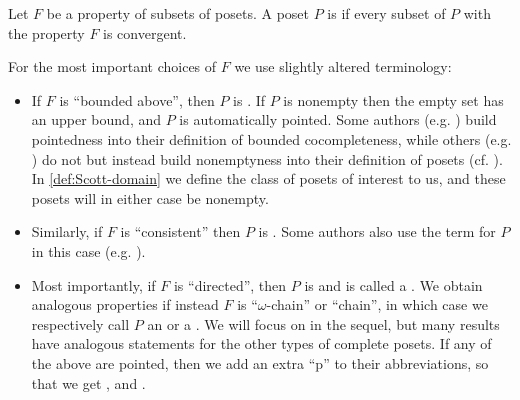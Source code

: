 \begin{definition}
    Let $F$ be a property of subsets of posets. A poset $P$ is  if every subset of $P$ with the property $F$ is convergent.
\end{definition}
%
For the most important choices of $F$ we use slightly altered terminology:
%
\begin{itemize}
    
    \item If $F$ is \enquote{bounded above}, then $P$ is . If $P$ is nonempty then the empty set has an upper bound, and $P$ is automatically pointed. Some authors (e.g. \cite[Definition~5.7.3]{goubault-larrecq-topology}) build pointedness into their definition of bounded cocompleteness, while others (e.g. \cite[Definition~O-2.1(v)]{gierz-continuous-lattices}) do not but instead build nonemptyness into their definition of posets (cf. \cite[Definition~O-1.6]{gierz-continuous-lattices}). In \cref{def:Scott-domain} we define the class of posets of interest to us, and these posets will in either case be nonempty.

    \item Similarly, if $F$ is \enquote{consistent} then $P$ is . Some authors also use the term  for $P$ in this case (e.g. \cite[Definition~1.2.28]{barendregt-lambda}).

    \item Most importantly, if $F$ is \enquote{directed}, then $P$ is  and is called a \keyword{\dCPO}. We obtain analogous properties if instead $F$ is \enquote{$\omega$-chain} or \enquote{chain}, in which case we respectively call $P$ an \keyword{\oCPO} or a \keyword{\cCPO}. We will focus on \dCPOpl{} in the sequel, but many results have analogous statements for the other types of complete posets. If any of the above are pointed, then we add an extra \enquote{p} to their abbreviations, so that we get \keyword{\oCPPO}, \keyword{\cCPPO} and \keyword{\dCPPO}.
\end{itemize}

